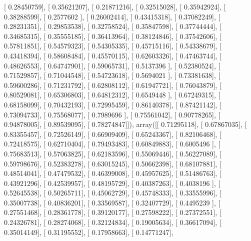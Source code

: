 \documentclass{article}
\begin{document}
       [ 0.28450759],
       [ 0.35621207],
       [ 0.21871216],
       [ 0.32515028],
       [ 0.35942924],
       [ 0.38288599],
       [ 0.2577602 ],
       [ 0.26002414],
       [ 0.43415318],
       [ 0.37082249],
       [ 0.28231351],
       [ 0.29853538],
       [ 0.32758524],
       [ 0.35847598],
       [ 0.37744444],
       [ 0.34685315],
       [ 0.35555185],
       [ 0.36413964],
       [ 0.38124846],
       [ 0.37542606],
       [ 0.57811851],
       [ 0.54579323],
       [ 0.54305335],
       [ 0.45715116],
       [ 0.54338679],
       [ 0.43418394],
       [ 0.58608484],
       [ 0.45570115],
       [ 0.62603326],
       [ 0.47463744],
       [ 0.48626553],
       [ 0.64747901],
       [ 0.59065731],
       [ 0.5137396 ],
       [ 0.52380524],
       [ 0.71529857],
       [ 0.71044548],
       [ 0.54723618],
       [ 0.5694021 ],
       [ 0.73381638],
       [ 0.59600286],
       [ 0.71231792],
       [ 0.62808112],
       [ 0.61947721],
       [ 0.76043879],
       [ 0.80529081],
       [ 0.65306803],
       [ 0.64812312],
       [ 0.6549448 ],
       [ 0.67249315],
       [ 0.68158099],
       [ 0.70432193],
       [ 0.72995459],
       [ 0.86140378],
       [ 0.87421142],
       [ 0.73094733],
       [ 0.75568077],
       [ 0.7989696 ],
       [ 0.75561042],
       [ 0.90778265],
       [ 0.94878005],
       [ 0.89539095],
       [ 0.78274847]]), array([[ 0.71295118],
       [ 0.67867035],
       [ 0.83355457],
       [ 0.72526149],
       [ 0.66909409],
       [ 0.65243367],
       [ 0.82106468],
       [ 0.72418575],
       [ 0.62710404],
       [ 0.79493483],
       [ 0.60849883],
       [ 0.6005496 ],
       [ 0.75683513],
       [ 0.57063825],
       [ 0.62183596],
       [ 0.55069446],
       [ 0.56227089],
       [ 0.59798676],
       [ 0.52383278],
       [ 0.63015245],
       [ 0.50662398],
       [ 0.68107881],
       [ 0.48514041],
       [ 0.47479532],
       [ 0.46399008],
       [ 0.45957625],
       [ 0.51486763],
       [ 0.43921296],
       [ 0.42539957],
       [ 0.48195729],
       [ 0.40387263],
       [ 0.4038196 ],
       [ 0.52645538],
       [ 0.50265711],
       [ 0.45062729],
       [ 0.45748333],
       [ 0.33555996],
       [ 0.35007738],
       [ 0.40836201],
       [ 0.33569587],
       [ 0.32407729],
       [ 0.4495239 ],
       [ 0.27551468],
       [ 0.28361778],
       [ 0.39120177],
       [ 0.27598222],
       [ 0.27372551],
       [ 0.24326781],
       [ 0.28274068],
       [ 0.32124834],
       [ 0.19005634],
       [ 0.36617094],
       [ 0.35014149],
       [ 0.31195552],
       [ 0.17958663],
       [ 0.14771247],
\end{document}
